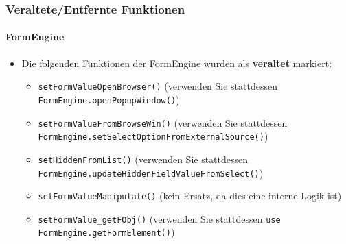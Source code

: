 \begin{frame}[fragile]
	\frametitle{Veraltete/Entfernte Funktionen}
	\framesubtitle{FormEngine}

	\lstset{basicstyle=\tiny\ttfamily}

	\begin{itemize}
		\item Die folgenden Funktionen der FormEngine wurden als \textbf{veraltet} markiert:

			\begin{itemize}
				\item \texttt{setFormValueOpenBrowser()}\newline
					\smaller(verwenden Sie stattdessen \texttt{FormEngine.openPopupWindow()})\small

				\item \texttt{setFormValueFromBrowseWin()}\newline
					\smaller(verwenden Sie stattdessen \texttt{FormEngine.setSelectOptionFromExternalSource()})\small

				\item \texttt{setHiddenFromList()}\newline
					\smaller(verwenden Sie stattdessen \texttt{FormEngine.updateHiddenFieldValueFromSelect()})\small

				\item \texttt{setFormValueManipulate()}\newline
					\smaller(kein Ersatz, da dies eine interne Logik ist)\small

				\item \texttt{setFormValue\_getFObj()}\newline
					\smaller(verwenden Sie stattdessen \texttt{use FormEngine.getFormElement()})\small

			\end{itemize}

	\end{itemize}

\end{frame}


